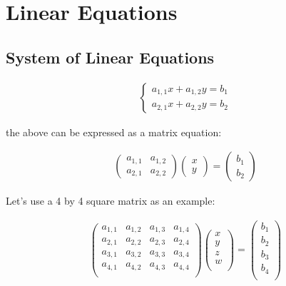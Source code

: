 \documentclass{article}
\begin{document}
\section{Linear Equations}

\subsection{System of Linear Equations}

\begin{align}
    \begin{cases}
        a_{1,1}x + a_{1,2}y = b_1 \\
        a_{2,1}x + a_{2,2}y = b_2
    \end{cases}
\end{align}

the above can be expressed as a matrix equation:

\begin{align}
    \begin{pmatrix}
        a_{1,1} & a_{1,2} \\
        a_{2,1} & a_{2,2}
    \end{pmatrix}
    \begin{pmatrix}
        x \\
        y
    \end{pmatrix}
    =
    \begin{pmatrix}
        b_1 \\
        b_2
    \end{pmatrix}
\end{align}

Let's use a 4 by 4 square matrix as an example:

\begin{align}
    \begin{pmatrix}
        a_{1,1} & a_{1,2} & a_{1,3} & a_{1,4} \\
        a_{2,1} & a_{2,2} & a_{2,3} & a_{2,4} \\
        a_{3,1} & a_{3,2} & a_{3,3} & a_{3,4} \\
        a_{4,1} & a_{4,2} & a_{4,3} & a_{4,4} \\
    \end{pmatrix}
    \begin{pmatrix}
        x \\
        y \\
        z \\
        w \\
    \end{pmatrix}
    =
    \begin{pmatrix}
        b_1 \\
        b_2 \\
        b_3 \\
        b_4 \\
    \end{pmatrix}
\end{align}
\end{document}

